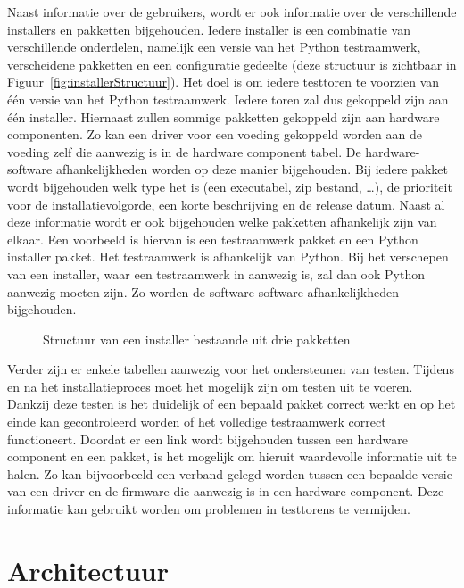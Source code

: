 Naast informatie over de gebruikers, wordt er ook informatie over de verschillende installers en pakketten bijgehouden.
Iedere installer is een combinatie van verschillende onderdelen, namelijk een versie van het Python testraamwerk, verscheidene pakketten en een configuratie gedeelte (deze structuur is zichtbaar in Figuur~\vref{fig:installerStructuur}).
Het doel is om iedere testtoren te voorzien van één versie van het Python testraamwerk.
Iedere toren zal dus gekoppeld zijn aan één installer.
Hiernaast zullen sommige pakketten gekoppeld zijn aan hardware componenten.
Zo kan een driver voor een voeding gekoppeld worden aan de voeding zelf die aanwezig is in de hardware component tabel.
De hardware-software afhankelijkheden worden op deze manier bijgehouden.
Bij iedere pakket wordt bijgehouden welk type het is (een executabel, zip bestand, \ldots), de prioriteit voor de installatievolgorde, een korte beschrijving en de release datum.
Naast al deze informatie wordt er ook bijgehouden welke pakketten afhankelijk zijn van elkaar.
Een voorbeeld is hiervan is een testraamwerk pakket en een Python installer pakket.
Het testraamwerk is afhankelijk van Python. 
Bij het verschepen van een installer, waar een testraamwerk in aanwezig is, zal dan ook Python aanwezig moeten zijn.
Zo worden de software-software afhankelijkheden bijgehouden.

\begin{figure}[!ht]
\centering
{}
\caption{Structuur van een installer bestaande uit drie pakketten}
\label{fig:installerStructuur}
\end{figure}

Verder zijn er enkele tabellen aanwezig voor het ondersteunen van testen.
Tijdens en na het installatieproces moet het mogelijk zijn om testen uit te voeren.
Dankzij deze testen is het duidelijk of een bepaald pakket correct werkt en op het einde kan gecontroleerd worden of het volledige testraamwerk correct functioneert.
Doordat er een link wordt bijgehouden tussen een hardware component en een pakket, is het mogelijk om hieruit waardevolle informatie uit te halen.
Zo kan bijvoorbeeld een verband gelegd worden tussen een bepaalde versie van een driver en de firmware die aanwezig is in een hardware component.
Deze informatie kan gebruikt worden om problemen in testtorens te vermijden.

\section{Architectuur}

